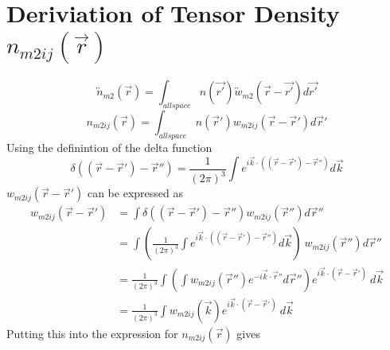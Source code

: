 \documentclass[double,12pt]{beavtex}
\begin{document}
\section{Deriviation of Tensor Density $n_{m2ij}(\vec{r})$}
\begin{equation}{\overleftrightarrow{n}_{m2}(\vec{r})=\int_{allspace}n(\vec{r'})\overleftrightarrow{w}_{m2}(\vec{r}-\vec{r'})d{\vec{r'}}}\end{equation} 
\begin{equation}{n_{m2ij}(\vec{r})=\int_{allspace}{n(\vec{r}')w_{m2ij}(\vec{r}-\vec{r}'){}d{\vec{r}'}}}\end{equation}
Using the definintion of the delta function
\begin{equation}{\delta}((\vec{r}-\vec{r}')-\vec{r}'')={ \frac{1}{\left(2\pi\right)^3}\int e^{i\vec k\cdot ((\vec r-\vec r')-\vec{r}'')}d\vec{k}}\end{equation} 
$w_{m2ij}(\vec{r}-\vec{r}')$ can be expressed as
\begin{align}
    w_{m2ij}(\vec{r}-\vec{r}') &= \int{\delta((\vec{r}-\vec{r}')-\vec{r}'')w_{m2ij}(\vec{r}''){}d{\vec{r}''}} \\
    &= \int{\left(\frac{1}{\left(2\pi\right)^3}\int e^{i\vec k\cdot((\vec r-\vec r')-\vec{r}'')}d\vec{k}\right){~}w_{m2ij}(\vec{r}''){}d{\vec{r}''}} \\
    &= \frac{1}{\left(2\pi\right)^3}\int{\left(\int w_{m2ij}(\vec{r}'')e^{-i\vec k\cdot\vec{r}''}d\vec{r}''\right)e^{i\vec k\cdot(\vec r-\vec r')}{~}{}d{\vec{k}}} \\
    &= \frac{1}{\left(2\pi\right)^3}\int{w_{m2ij}(\vec k)e^{i\vec k\cdot(\vec r-\vec r')}{~}{}d{\vec{k}}} 
  \end{align} 
Putting this into the expression for $n_{m2ij}(\vec{r})$ gives 
\end{document}
